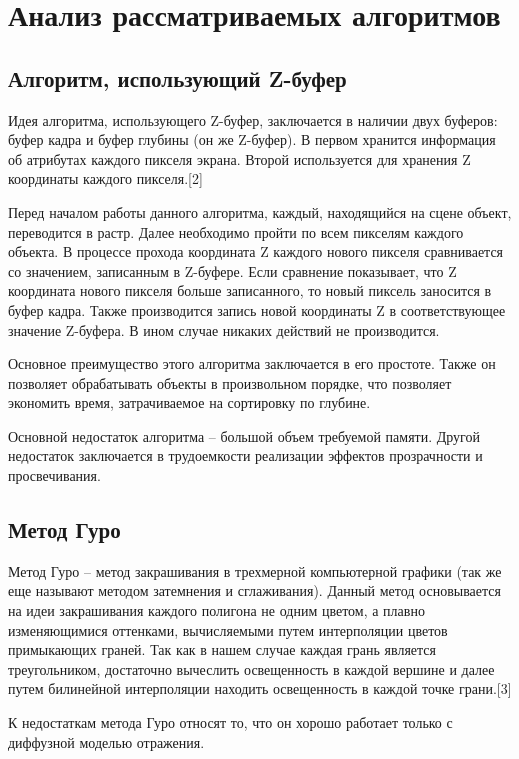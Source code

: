 \documentclass[12pt]{report}
\begin{document}
	\section{Анализ рассматриваемых алгоритмов}
	
	\subsection{Алгоритм, использующий Z-буфер}
	
	Идея алгоритма, использующего Z-буфер, заключается в наличии двух буферов: буфер кадра и буфер глубины (он же Z-буфер). В первом хранится информация об атрибутах каждого пикселя экрана. Второй используется для хранения Z координаты каждого пикселя.[2]
	
	Перед началом работы данного алгоритма, каждый, находящийся на сцене объект, переводится в растр. Далее необходимо пройти по всем пикселям каждого объекта. В процессе прохода координата Z каждого нового пикселя сравнивается со значением, записанным в Z-буфере. Если сравнение показывает, что Z координата нового пикселя больше записанного, то новый пиксель заносится в буфер кадра. Также производится запись новой координаты Z в соответствующее значение Z-буфера. В ином случае никаких действий не производится.
	
	Основное преимущество этого алгоритма заключается в его простоте. Также он позволяет обрабатывать объекты в произвольном порядке, что позволяет экономить время, затрачиваемое на сортировку по глубине.
	
	Основной недостаток алгоритма – большой объем требуемой памяти. Другой недостаток заключается в трудоемкости реализации эффектов прозрачности и просвечивания.

	\subsection{Метод Гуро}

	Метод Гуро – метод закрашивания в трехмерной компьютерной графики (так же еще называют методом затемнения и сглаживания). 
	Данный метод основывается на идеи закрашивания каждого полигона не одним цветом, а плавно изменяющимися оттенками, вычисляемыми путем интерполяции цветов примыкающих граней. Так как в нашем случае каждая грань является треугольником, достаточно вычеслить освещенность в каждой вершине и далее путем билинейной интерполяции находить освещенность в каждой точке грани.[3]
	
	К недостаткам метода Гуро относят то, что он хорошо работает только с диффузной моделью отражения. 
\end{document}
